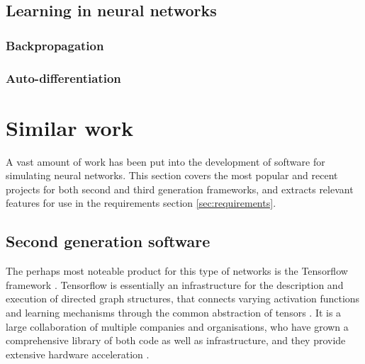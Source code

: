 \documentclass[report.tex]{subfiles}
\begin{document}


\subsection{Learning in neural networks}


\subsubsection{Backpropagation}

\subsubsection{Auto-differentiation}
\pagebreak
\section{Similar work}
A vast amount of work has been put into the development of software for simulating
neural networks.
This section covers the most popular and recent projects for both second and third
generation frameworks, and extracts relevant
features for use in the requirements section \ref{sec:requirements}.

\subsection{Second generation software}
The perhaps most noteable product for this type of networks is the Tensorflow 
framework \cite{Abadi2016}.
Tensorflow is essentially an infrastructure for the description and execution of directed graph 
structures,
that connects varying activation functions and learning mechanisms through the common abstraction
of tensors \cite{Abadi2015}.
It is a large collaboration of multiple companies and organisations, who have
grown a comprehensive library of both code as well as infrastructure, and they
provide extensive hardware acceleration \cite{Abadi2015}.
\end{document}
